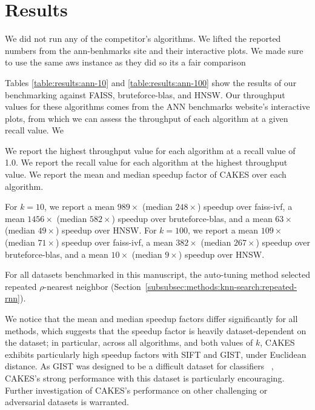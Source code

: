 \section{Results}
\label{sec:results}

We did not run any of the competitor’s algorithms. We lifted the reported numbers from the ann-benhmarks site and their interactive plots. We made sure to use the same aws instance as they did so its a fair comparison


Tables \ref{table:results:ann-10} and \ref{table:results:ann-100} show the results of our benchmarking against FAISS, bruteforce-blas, and HNSW. Our throughput values for these algorithms comes from the ANN benchmarks website's interactive plots, from which we can assess the throughput of each algorithm at a given recall value. We 


We report the highest throughput value for each algorithm at a recall value of 1.0. We report the recall value for each algorithm at the highest throughput value. We report the mean and median speedup factor of CAKES over each algorithm.

For $k= 10$, we report a mean $989\times$ (median $248\times$) speedup over faiss-ivf, a mean $1456\times$ (median $582\times$) speedup over bruteforce-blas, 
and a mean $63\times$ (median $49\times$) speedup over HNSW. For $k=100$, we report a mean $109\times$ (median $71\times$) speedup over faiss-ivf, a mean $382\times$ (median $267\times$) speedup over bruteforce-blas, and a mean $10\times$ (median $9\times$) speedup over HNSW.


For all datasets benchmarked in this manuscript, the auto-tuning method selected repeated $\rho$-nearest neighbor (Section~\ref{subsubsec:methods:knn-search:repeated-rnn}).

We notice that the mean and median speedup factors differ significantly for all methods, which suggests that the speedup factor is heavily dataset-dependent on the dataset; in particular, across all algorithms, and both values of $k$, CAKES exhibits particularly high speedup factors with SIFT and GIST, under Euclidean distance. As GIST was designed to be a difficult dataset for classifiers~\cite{Lee2019PracticalLP} , CAKES's strong performance with this dataset is particularly encouraging. Further investigation of CAKES's performance on other challenging or adversarial datasets is warranted. 

